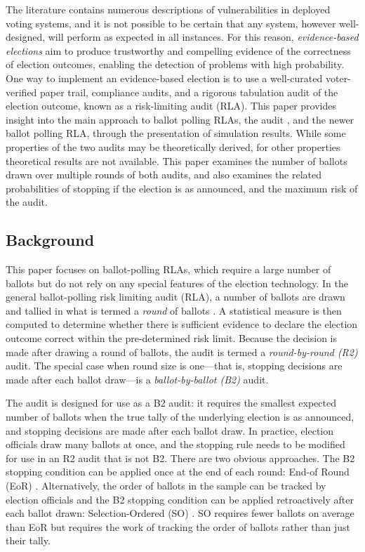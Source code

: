 The literature contains numerous descriptions of vulnerabilities in deployed voting systems, and it is not possible to be certain that any system, however well-designed, will perform as expected in all instances. For this reason, 
{\em evidence-based elections} aim to produce trustworthy and compelling evidence of the correctness of election outcomes, enabling the detection of problems with high probability. One way to implement an evidence-based election is to use a well-curated voter-verified paper trail, compliance audits, and a rigorous tabulation audit of the election outcome, known as a risk-limiting audit (RLA). This paper provides insight into the main approach to ballot polling RLAs, the \BRAVO audit \cite{bravo}, and the newer \Minerva \cite{usenix_minerva} ballot polling RLA, through the presentation of simulation results. While some properties of the two audits may be theoretically derived, for other properties theoretical results are not available. This paper examines the number of ballots drawn over multiple rounds of both audits, and also examines the related probabilities of stopping if the election is as announced, and the maximum risk of the audit. 

\subsection{Background}
This paper focuses on ballot-polling RLAs, which require a large number of ballots but do not rely on any special features of the election technology. In the general ballot-polling risk limiting audit (RLA), a number of ballots are drawn and tallied in what is termed a {\em round} of ballots \cite{usenix_minerva}. A statistical measure is then computed to determine whether there is sufficient evidence to declare the election outcome correct within the pre-determined risk limit. Because the decision is made after drawing a round of ballots, the audit is termed a {\em round-by-round (R2)} audit. The special case when round size is one---that is, stopping decisions are made after each ballot draw---is a {\em ballot-by-ballot (B2)} audit. 

The \BRAVO audit is designed for use as a B2 audit: it requires the smallest expected number of ballots when the true tally of the underlying election is as announced, and stopping decisions are made after each ballot draw. In practice, election officials draw many ballots at once, and the \BRAVO stopping rule needs to be modified for use in an R2 audit that is not B2. There are two obvious approaches. The B2 stopping condition can be applied once at the end of each round: End-of Round (EoR) \BRAVO.  Alternatively, the order of ballots in the sample can be tracked by election officials and the B2 \BRAVO stopping condition can be applied retroactively after each ballot drawn: Selection-Ordered (SO) \BRAVO. SO \BRAVO requires fewer ballots on average than EoR \BRAVO but requires the work of tracking the order of ballots rather than just their tally.

